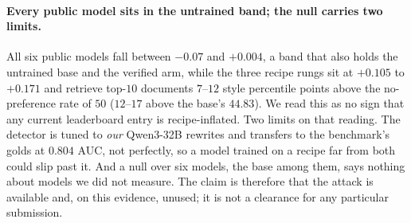 \paragraph{Every public model sits in the untrained band; the null carries two limits.}
All six public models fall between $-0.07$ and $+0.004$, a band that also holds the untrained base and the verified arm, while the three recipe rungs sit at $+0.105$ to $+0.171$ and retrieve top-$10$ documents $7$--$12$ style percentile points above the no-preference rate of $50$ ($12$--$17$ above the base's $44.83$). We read this as no sign that any current leaderboard entry is recipe-inflated. Two limits on that reading. The detector is tuned to \emph{our} Qwen3-32B rewrites and transfers to the benchmark's golds at $0.804$ AUC, not perfectly, so a model trained on a recipe far from both could slip past it. And a null over six models, the base among them, says nothing about models we did not measure. The claim is therefore that the attack is available and, on this evidence, unused; it is not a clearance for any particular submission.
